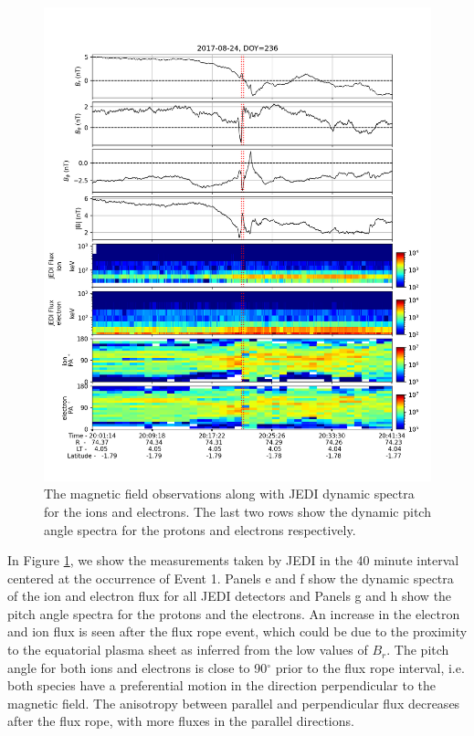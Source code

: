 \begin{figure}
    \centering
    \includegraphics[width=\textwidth]{images5/event-1-jedi.png}
    \caption{The magnetic field observations along with JEDI dynamic spectra for the ions and electrons. The last two rows show the dynamic pitch angle spectra for the protons and electrons respectively.}
    \label{fig:event1-jedi}
\end{figure}

In Figure \ref{fig:event1-jedi}, we show the measurements taken by JEDI in the 40 minute interval centered at the occurrence of Event 1. Panels e and f show the dynamic spectra of the ion and electron flux for all JEDI detectors and Panels g and h show the pitch angle spectra for the protons and the electrons. An increase in the electron and ion flux is seen after the flux rope event, which could be due to the proximity to the equatorial plasma sheet as inferred from the low values of $B_r$. The pitch angle for both ions and electrons is close to 90$^\circ$ prior to the flux rope interval, i.e. both species have a preferential motion in the direction perpendicular to the magnetic field. The anisotropy between parallel and perpendicular flux decreases after the flux rope, with more fluxes in the parallel directions. 


